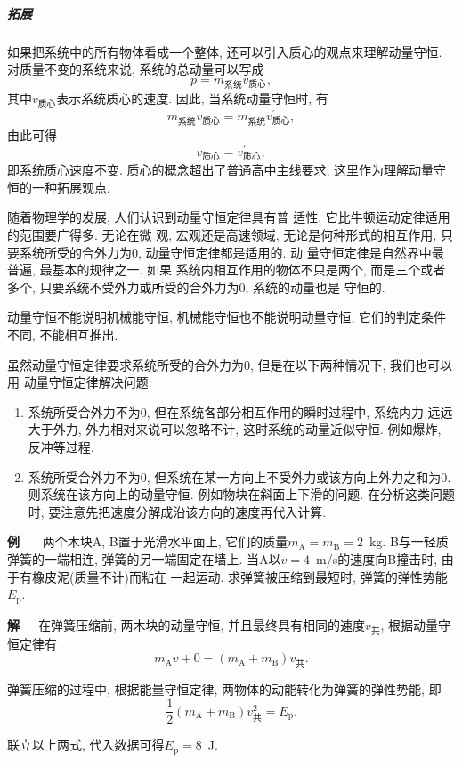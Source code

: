 \documentclass[11pt,a4paper]{ctexbook}
\newcounter{exam}[chapter]
\newcommand{\bre}{\ \ \ }
\newcommand{\examlabel}{\textbf{例\theexam}}
\newenvironment{example}{\bigskip\par\refstepcounter{exam}\examlabel\bre}{\par}
\begin{document}
\subparagraph{拓展} 如果把系统中的所有物体看成一个整体, 还可以引入质心的观点来理解动量守恒. 对质量不变的系统来说, 系统的总动量可以写成
$$p = m_\text{系统}v_\text{质心},$$
其中$v_\text{质心}$表示系统质心的速度. 因此, 当系统动量守恒时, 有
$$m_\text{系统}v_\text{质心} = m_\text{系统}v_\text{质心}^{\prime},$$
由此可得
$$v_\text{质心} = v_\text{质心}^{\prime},$$
即系统质心速度不变. 质心的概念超出了普通高中主线要求, 这里作为理解动量守恒的一种拓展观点.

随着物理学的发展, 人们认识到动量守恒定律具有普
适性, 它比牛顿运动定律适用的范围要广得多. 无论在微
观, 宏观还是高速领域, 无论是何种形式的相互作用, 只
要系统所受的合外力为0, 动量守恒定律都是适用的. 动
量守恒定律是自然界中最普遍, 最基本的规律之一. 如果
系统内相互作用的物体不只是两个, 而是三个或者多个,
只要系统不受外力或所受的合外力为0, 系统的动量也是
守恒的.

动量守恒不能说明机械能守恒, 机械能守恒也不能说明动量守恒,
它们的判定条件不同, 不能相互推出.

虽然动量守恒定律要求系统所受的合外力为0, 但是在以下两种情况下, 我们也可以用
动量守恒定律解决问题:
\begin{enumerate}
    \item 系统所受合外力不为0, 但在系统各部分相互作用的瞬时过程中, 系统内力
          远远大于外力, 外力相对来说可以忽略不计, 这时系统的动量近似守恒. 例如爆炸, 反冲等过程.
    \item 系统所受合外力不为0, 但系统在某一方向上不受外力或该方向上外力之和为0.
          则系统在该方向上的动量守恒. 例如物块在斜面上下滑的问题. 在分析这类问题时, 要注意先把速度分解成沿该方向的速度再代入计算.
\end{enumerate}

\begin{example}
    两个木块A, B置于光滑水平面上, 它们的质量$m_\mathrm{A} = m_\mathrm{B} = 2$\ kg.
B与一轻质弹簧的一端相连,
弹簧的另一端固定在墙上. 当A以$v = 4$\ m/s的速度向B撞击时, 由于有橡皮泥(质量不计)而粘在
一起运动. 求弹簧被压缩到最短时, 弹簧的弹性势能$E_\mathrm{p}$.
\end{example}

\textbf{解}\bre 在弹簧压缩前, 两木块的动量守恒, 并且最终具有相同的速度$v_\text{共}$,
根据动量守恒定律有$$m_\mathrm{A}v + 0 = (m_\mathrm{A}+m_\mathrm{B})v_\text{共}.$$

弹簧压缩的过程中, 根据能量守恒定律, 两物体的动能转化为弹簧的弹性势能, 即
$$\frac12 (m_\mathrm{A}+m_\mathrm{B}) v_\text{共}^2 = E_\mathrm{p}.$$

联立以上两式, 代入数据可得$E_\mathrm{p} = 8$\ J.
\end{document}
